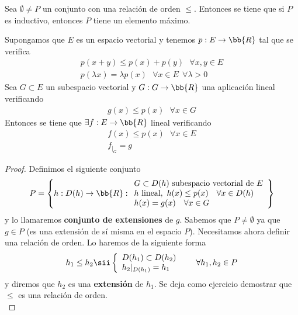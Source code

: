 \begin{lema}
    Sea $\emptyset \neq P$ un conjunto con una relación de orden $\leq$. Entonces se tiene que si $P$ es inductivo, entonces $P$ tiene un elemento máximo.
\end{lema}

\begin{teo}
    Supongamos que $E$ es un espacio vectorial y tenemos $p:E\to \bb{R}$ tal que se verifica
    \begin{gather*}
        p(x+y) \leq p(x) + p(y)\ \ \ \forall x,y\in E\\
        p(\lambda x) = \lambda p(x) \ \ \ \forall x \in E\ \ \forall \lambda >0
    \end{gather*}
    Sea $G\subset E$ un subespacio vectorial y $G:G\to \bb{R}$ una aplicación lineal verificando
    \begin{gather*}
        g(x) \leq p(x)\ \ \ \forall x \in G
    \end{gather*}
    Entonces se tiene que $\exists f:E\to \bb{R}$ lineal verificando
    \begin{gather*}
        f(x) \leq p(x)\ \ \ \forall x \in E\\
        f_{|_G} = g
    \end{gather*}

    \begin{proof}
        Definimos el siguiente conjunto
        \begin{gather*}
            P = \left\{h: D(h) \to \bb{R} :
            \begin{array}{l}
                G\subset D(h) \text{ subespacio vectorial de }E\\
                h\text{ lineal},\ h(x)\leq p(x)\ \ \ \forall x \in D(h) \\
                h(x) = g(x)\ \ \ \forall x \in G
            \end{array}
            \right\}
        \end{gather*}
        y lo llamaremos \textbf{conjunto de extensiones} de $g$. Sabemos que $P\neq \emptyset$ ya que $g\in P$ (es una extensión de sí misma en el espacio $P$). Necesitamos ahora definir una relación de orden. Lo haremos de la siguiente forma
        \begin{gather*}
            h_1\leq h_2 \sii \left\{
                \begin{array}{l}
                    D(h_1)\subset D(h_2)\\
                    h_2{|_{D(h_1)}} = h_1
                \end{array}
            \right.\ \ \ \ \ \forall h_1,h_2\in P
        \end{gather*}
        y diremos que $h_2$ es una \textbf{extensión} de $h_1$. Se deja como ejercicio demostrar que $\leq$ es una relación de orden.\\


\end{proof}
\end{teo}
